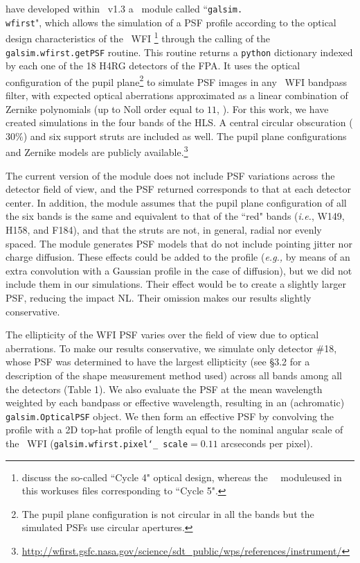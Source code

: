 \documentclass[11pt,preprint,flushrt]{aastex}
\begin{document}
\citet{kannawadi15} have developed within \gs\ v1.3 a \wfa\ module called ``{\tt{galsim.\\ wfirst}}", which allows the simulation of a PSF profile according to the optical design characteristics of the \wfa\ WFI \citep{pasquale14}\footnote{\citealt{pasquale14} discuss the so-called ``Cycle 4" optical design, whereas the \gs\ \wfa\ module\textemdash used in this work\textemdash uses files corresponding to ``Cycle 5".} through the calling of the {\tt{galsim.wfirst.getPSF}} routine. 
This routine returns a {\tt{python}} dictionary indexed by each one of the 18 H4RG detectors of the FPA. It uses the optical configuration of the pupil plane\footnote{The pupil plane configuration is not circular in all the bands but the simulated PSFs use circular apertures.} to simulate PSF images in any \wfa\ WFI bandpass filter, with expected optical aberrations approximated as a linear combination of Zernike polynomials (up to Noll order equal to $11$, \citealt{noll67}). For this work, we have created simulations in the four bands of the HLS.  A central circular obscuration ($30 \%$) and six support struts are included as well. The pupil plane configurations and Zernike models are publicly available.\footnote{\url{http://wfirst.gsfc.nasa.gov/science/sdt_public/wps/references/instrument/}} 

The current version of the module does not include PSF variations across the detector field of view, and the PSF returned corresponds to that at each detector center. In addition, the module assumes that the pupil plane configuration of all the six bands is the same and equivalent to that of the ``red" bands (\emph{i.e.}, W149, H158, and F184), and that the struts are not, in general, radial nor evenly spaced. 
The module generates PSF models that do not include pointing jitter nor charge diffusion. These effects could be added to the profile (\emph{e.g.,} by means of an extra convolution with a Gaussian profile in the case of diffusion), but we did not include them in our simulations. Their effect would be to create a slightly larger PSF, reducing the impact NL. Their omission makes our results slightly conservative.  

The ellipticity of the WFI PSF varies over the field of view due to optical aberrations. To make our results conservative, we simulate only detector \#18, whose PSF was determined to have the largest ellipticity (see \S3.2 for a description of the shape measurement method used) across all bands among all the detectors (Table 1). We also evaluate the PSF at the mean wavelength weighted by each bandpass or effective wavelength, resulting in an (achromatic) {\tt{galsim.OpticalPSF}} object.
We then form an effective PSF by convolving the profile with a 2D top-hat profile of length equal to the nominal angular scale of the \wfa\ WFI ({\tt{galsim.wfirst.pixel\char`_ scale$=0.11$}} arcseconds per pixel). 
\end{document}
